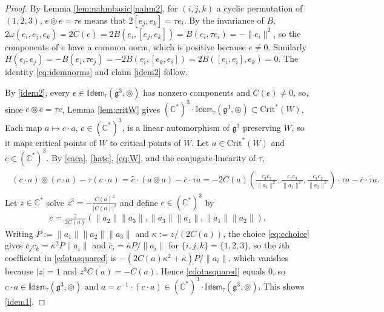 \documentclass[leqno,10pt]{amsart}
\theoremstyle{definition}
\numberwithin{equation}{section}
\newcommand{\idem}{\mathbb{Idem}}
\newcommand{\tmlt}{\circledcirc}
\newcommand{\om}{\omega}
\newcommand{\g}{\mathfrak{g}}
\newcommand{\com}{\mathbb C}
\newcommand{\crtnt}{\mathrm{Crit}^*}
\newcommand{\norm}[1]{\lVert #1\rVert}
\begin{document}
\begin{proof}
By Lemma \ref{lem:nahmbasic}\ref{nahm2}, for $(i, j, k)$ a cyclic permutation of $(1, 2, 3)$, $e \tmlt e = \tau e$ means that $2[e_{j}, e_{k}] = \tau e_{i}$. By the invariance of $B$, $2\om(e_{i}, e_{j}, e_{k}) = 2C(e) = 2B(e_{i}, [e_{j}, e_{k}]) = B(e_{i}, \tau e_{i}) = -\norm{e_{i}}^{2}$, so the components of $e$ have a common norm, which is positive because $e \neq 0$. Similarly $H(e_{i}, e_{j}) = -B(e_{i}, \tau e_{j}) = -2B(e_{i}, [e_{k}, e_{i}]) = 2B([e_{i}, e_{i}], e_{k}) = 0$. The identity \eqref{eq:idemnorms} and claim \ref{idem2} follow.

By \ref{idem2}, every $e \in \idem_{\tau}(\g^{3}, \tmlt)$ has nonzero components and $C(e) \neq 0$, so, since $e \tmlt e = \tau e$, Lemma \ref{lem:critW} gives $(\com^{\ast})^{3}\cdot \idem_{\tau}(\g^{3}, \tmlt) \subset \crtnt(W)$. Each map $a \mapsto c\cdot a$, $c \in (\com^{\ast})^{3}$, is a linear automorphism of $\g^{3}$ preserving $W$, so it maps critical points of $W$ to critical points of $W$. Let $a \in \crtnt(W)$ and $c \in (\com^{\ast})^{3}$. By \eqref{caca}, \eqref{hatc}, \eqref{eq:W}, and the conjugate-linearity of $\tau$,
\begin{align}\label{cdotasquared}
\begin{aligned}
(c\cdot a)\tmlt (c\cdot a) - \tau(c \cdot a) = \hat{c}\cdot (a\tmlt a) - \bar{c}\cdot \tau a = -2C(a)\left(\tfrac{c_{2}c_{3}}{\norm{a_{1}}^{2}}, \tfrac{c_{1}c_{3}}{\norm{a_{2}}^{2}}, \tfrac{c_{1}c_{2}}{\norm{a_{3}}^{2}} \right)\cdot \tau a - \bar{c}\cdot \tau a.
\end{aligned}
\end{align}
Let $z \in \com^{\ast}$ solve $z^{3} = -\tfrac{C(a)^{2}}{|C(a)|^{2}}$ and define $c \in (\com^{\ast})^{3}$ by
\begin{align}\label{eq:cchoice}
c = \tfrac{z}{2C(a)}\left(\norm{a_{2}}\norm{a_{3}}, \norm{a_{3}}\norm{a_{1}}, \norm{a_{1}}\norm{a_{2}}\right).
\end{align}
Writing $P := \norm{a_{1}}\norm{a_{2}}\norm{a_{3}}$ and $\kappa := z/(2C(a))$, the choice \eqref{eq:cchoice} gives $c_{j}c_{k} = \kappa^{2}P\norm{a_{i}}$ and $\bar{c}_{i} = \bar{\kappa}P/\norm{a_{i}}$ for $\{i, j, k\} = \{1, 2, 3\}$, so the $i$th coefficient in \eqref{cdotasquared} is $-(2C(a)\kappa^{2} + \bar{\kappa})P/\norm{a_{i}}$, which vanishes because $|z| = 1$ and $z^{3}\overline{C(a)} = -C(a)$. Hence \eqref{cdotasquared} equals $0$, so $c \cdot a \in \idem_{\tau}(\g^{3}, \tmlt)$ and $a = c^{-1}\cdot(c \cdot a) \in (\com^{\ast})^{3}\cdot\idem_{\tau}(\g^{3}, \tmlt)$. This shows \ref{idem1}. 


\end{proof}
\end{document}
